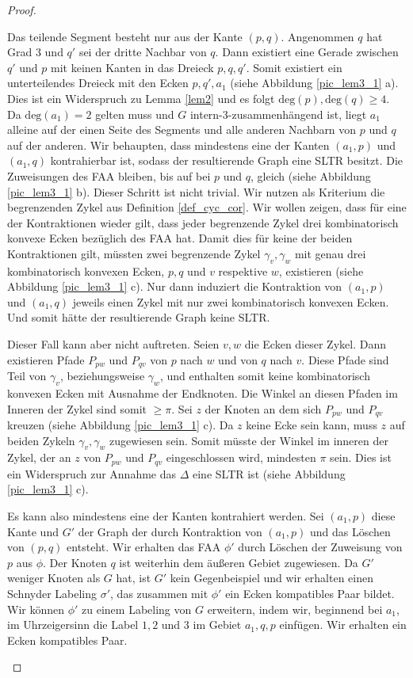 \begin{proof}
\begin{description}[leftmargin =0pt, font = \rmfamily,listparindent=\parindent,parsep=0pt]
\item[Fall 1:] Das teilende Segment besteht nur aus der Kante $(p,q)$. Angenommen $q$ hat Grad 3 und $q'$ sei der dritte Nachbar von $q$. Dann existiert eine Gerade zwischen $q'$ und $p$ mit keinen Kanten in das Dreieck $p,q,q'$. Somit existiert ein unterteilendes Dreieck mit den Ecken $p,q',a_1$ (siehe Abbildung \ref{pic_lem3_1} a). Dies ist ein Widerspruch zu Lemma \ref{lem2} und es folgt $\text{deg}(p),\text{deg}(q) \geq 4$. Da $\text{deg}(a_1) = 2$ gelten muss und $G$ intern-3-zusammenhängend ist, liegt $a_1$ alleine auf der einen Seite des Segments und alle anderen Nachbarn von $p$ und $q$ auf der anderen. 
Wir behaupten, dass mindestens eine der Kanten $(a_1,p)$ und $(a_1,q)$ kontrahierbar ist, sodass der resultierende Graph eine SLTR besitzt. Die Zuweisungen des FAA bleiben, bis auf bei $p$ und $q$, gleich (siehe Abbildung \ref{pic_lem3_1} b). Dieser Schritt ist nicht trivial. Wir nutzen als Kriterium die begrenzenden Zykel aus Definition \ref{def_cyc_cor}. Wir wollen zeigen, dass für eine der Kontraktionen wieder gilt, dass jeder begrenzende Zykel drei kombinatorisch konvexe Ecken bezüglich des FAA hat. Damit dies für keine der beiden Kontraktionen gilt, müssten zwei begrenzende Zykel $\gamma_v,\gamma_w$ mit genau drei kombinatorisch konvexen Ecken, $p,q$ und $v$ respektive $w$, existieren (siehe Abbildung \ref{pic_lem3_1} c). Nur dann induziert die Kontraktion von $(a_1,p)$ und $(a_1,q)$ jeweils einen Zykel mit nur zwei kombinatorisch konvexen Ecken. Und somit hätte der resultierende Graph keine SLTR.

Dieser Fall kann aber nicht auftreten. Seien $v,w$ die Ecken dieser Zykel. Dann existieren Pfade $P_{pw}$ und $P_{qv}$ von $p$ nach $w$ und von $q$ nach $v$. Diese Pfade sind Teil von $\gamma_v$, beziehungsweise $\gamma_w$, und enthalten somit keine kombinatorisch konvexen Ecken mit Ausnahme der Endknoten. Die Winkel an diesen Pfaden im Inneren der Zykel sind somit $\geq \pi$. Sei $z$ der Knoten an dem sich $P_{pw}$ und $P_{qv}$ kreuzen (siehe Abbildung \ref{pic_lem3_1} c). Da $z$ keine Ecke sein kann, muss $z$ auf beiden Zykeln $\gamma_v,\gamma_w$  zugewiesen sein. Somit müsste der Winkel im inneren der Zykel, der an $z$ von $P_{pw}$ und $P_{qv}$ eingeschlossen wird, mindesten $\pi$ sein. Dies ist ein Widerspruch zur Annahme das $\Delta$ eine SLTR ist (siehe Abbildung \ref{pic_lem3_1} c).

Es kann also mindestens eine der Kanten kontrahiert werden. Sei $(a_1,p)$ diese Kante und $G'$ der Graph der durch Kontraktion von $(a_1,p)$ und das Löschen von $(p,q)$ entsteht. Wir erhalten das FAA $\phi'$ durch Löschen der Zuweisung von $p$ aus $\phi$. Der Knoten $q$ ist weiterhin dem äußeren Gebiet zugewiesen. Da $G'$ weniger Knoten als $G$ hat, ist $G'$ kein Gegenbeispiel und wir erhalten einen Schnyder Labeling $\sigma'$, das zusammen mit $\phi'$ ein Ecken kompatibles Paar bildet. Wir können $\phi'$ zu einem Labeling von $G$ erweitern, indem wir, beginnend bei $a_1$, im Uhrzeigersinn die Label $1,2$ und $3$ im Gebiet $a_1,q,p$ einfügen. Wir erhalten ein Ecken kompatibles Paar.


\end{description}
\end{proof}
